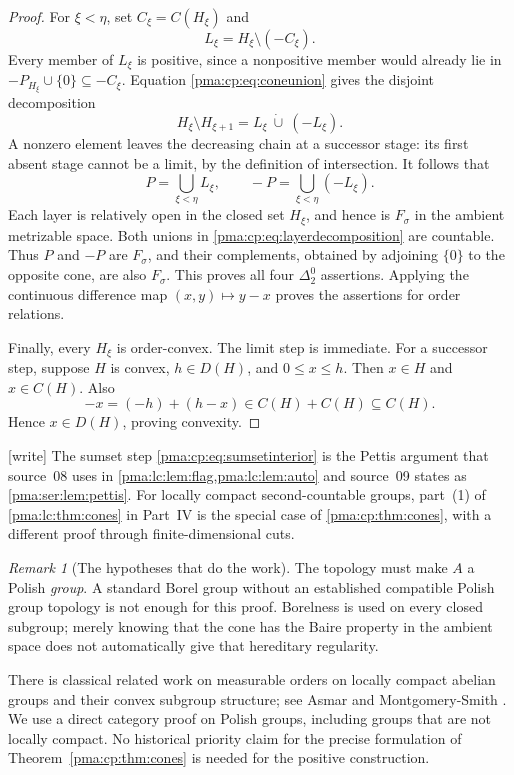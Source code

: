 \documentclass[11pt]{article}
\numberwithin{equation}{section}
\theoremstyle{definition}
\theoremstyle{remark}
\newtheorem{remark}[remark]{Remark}
\newcommand{\writetag}{\textup{\textsf{\small[write]}}}
\begin{document}
\begin{proof}
For $\xi<\eta$, set $C_\xi=C(H_\xi)$ and
\[
L_\xi=H_\xi\setminus(-C_\xi).
\]
Every member of $L_\xi$ is positive, since a nonpositive member would
already lie in $-P_{H_\xi}\cup\{0\}\subseteq-C_\xi$. Equation
\eqref{pma:cp:eq:coneunion} gives the disjoint decomposition
\[
H_\xi\setminus H_{\xi+1}=L_\xi\ \dot\cup\ (-L_\xi).
\]
A nonzero element leaves the decreasing chain at a successor stage:
its first absent stage cannot be a limit, by the definition of intersection.
It follows that
\begin{equation}
\label{pma:cp:eq:layerdecomposition}
P=\bigcup_{\xi<\eta}L_\xi,\qquad
-P=\bigcup_{\xi<\eta}(-L_\xi).
\end{equation}
Each layer is relatively open in the closed set $H_\xi$, and hence is
$F_\sigma$ in the ambient metrizable space. Both unions in
\eqref{pma:cp:eq:layerdecomposition} are countable. Thus $P$ and $-P$ are
$F_\sigma$, and their complements, obtained by adjoining $\{0\}$ to
the opposite cone, are also $F_\sigma$. This proves all four
$\Delta^0_2$ assertions. Applying the continuous difference map
$(x,y)\mapsto y-x$ proves the assertions for order relations.

Finally, every $H_\xi$ is order-convex. The limit step is immediate.
For a successor step, suppose $H$ is convex, $h\in D(H)$, and
$0\leq x\leq h$. Then $x\in H$ and $x\in C(H)$. Also
\[
-x=(-h)+(h-x)\in C(H)+C(H)\subseteq C(H).
\]
Hence $x\in D(H)$, proving convexity.
\end{proof}

\noindent\writetag{} The sumset step \eqref{pma:cp:eq:sumsetinterior} is the
Pettis argument that source~08 uses in \cref{pma:lc:lem:flag,pma:lc:lem:auto}
and source~09 states as \cref{pma:ser:lem:pettis}. For locally compact
second-countable groups, part~(1) of \cref{pma:lc:thm:cones} in Part~IV is
the special case of \cref{pma:cp:thm:cones}, with a different proof through
finite-dimensional cuts.

\begin{remark}[The hypotheses that do the work]
The topology must make $A$ a Polish \emph{group}. A standard Borel group
without an established compatible Polish group topology is not enough for
this proof. Borelness is used on every closed subgroup; merely knowing that
the cone has the Baire property in the ambient space does not automatically
give that hereditary regularity.
\end{remark}

There is classical related work on measurable orders on locally compact
abelian groups and their convex subgroup structure; see Asmar and
Montgomery-Smith \cite{AsmarMS}. We use a direct category proof on Polish
groups, including groups that are not locally compact. No historical
priority claim for the precise formulation of Theorem~\ref{pma:cp:thm:cones}
is needed for the positive construction.
\end{document}
